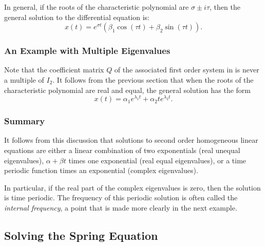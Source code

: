 In general, if the roots of the characteristic polynomial are
$\sigma\pm i\tau$, then the general solution to the differential equation is:
\[
x(t) = e^{\sigma t}\left(\beta_1\cos(\tau t) + \beta_2\sin(\tau t)\right).
\]

\subsubsection*{An Example with Multiple Eigenvalues}

Note that the coefficient matrix $Q$ of the associated first order system
in  is never a multiple of $I_2$.  It follows from the
previous section
that when the roots of the characteristic polynomial are real and equal,
the general solution has the form
\[
x(t) = \alpha_1 e^{\lambda_1t} + \alpha_2te^{\lambda_2t}.
\]

\subsubsection*{Summary}

It follows from this discussion that solutions to second order
homogeneous linear equations are either a linear combination of two
exponentials (real unequal eigenvalues), $\alpha+\beta t$ times one
exponential (real equal eigenvalues), or a time periodic function times
an exponential (complex eigenvalues).

In particular, if the real part
of the complex eigenvalues is zero, then the solution is time periodic.
The frequency of this periodic solution is often called the {\em internal
frequency}, a point
that is made more clearly in the next example.


\subsection*{Solving the Spring Equation}

